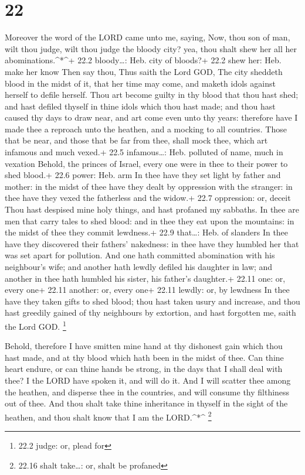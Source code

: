 \hypertarget{section-21}{%
\section{22}\label{section-21}}

 Moreover the word of the LORD came unto me, saying,
 Now, thou son of man, wilt thou judge, wilt thou judge the
bloody city? yea, thou shalt shew her all her abominations.\^{}*\^{}+
22.2 bloody\ldots: Heb. city of bloods?+ 22.2 shew her: Heb. make her
know  Then say thou, Thus saith the Lord GOD, The city
sheddeth blood in the midst of it, that her time may come, and maketh
idols against herself to defile herself.  Thou art become
guilty in thy blood that thou hast shed; and hast defiled thyself in
thine idols which thou hast made; and thou hast caused thy days to draw
near, and art come even unto thy years: therefore have I made thee a
reproach unto the heathen, and a mocking to all countries. 
Those that be near, and those that be far from thee, shall mock thee,
which art infamous and much vexed.+ 22.5 infamous\ldots: Heb. polluted
of name, much in vexation  Behold, the princes of Israel,
every one were in thee to their power to shed blood.+ 22.6 power: Heb.
arm  In thee have they set light by father and mother: in
the midst of thee have they dealt by oppression with the stranger: in
thee have they vexed the fatherless and the widow.+ 22.7 oppression: or,
deceit  Thou hast despised mine holy things, and hast
profaned my sabbaths.  In thee are men that carry tales to
shed blood: and in thee they eat upon the mountains: in the midst of
thee they commit lewdness.+ 22.9 that\ldots: Heb. of slanders
 In thee have they discovered their fathers' nakedness: in
thee have they humbled her that was set apart for pollution.
 And one hath committed abomination with his neighbour's
wife; and another hath lewdly defiled his daughter in law; and another
in thee hath humbled his sister, his father's daughter.+ 22.11 one: or,
every one+ 22.11 another: or, every one+ 22.11 lewdly: or, by lewdness
 In thee have they taken gifts to shed blood; thou hast
taken usury and increase, and thou hast greedily gained of thy
neighbours by extortion, and hast forgotten me, saith the Lord GOD.
\footnote{22.2 judge: or, plead for}

 Behold, therefore I have smitten mine hand at thy
dishonest gain which thou hast made, and at thy blood which hath been in
the midst of thee.  Can thine heart endure, or can thine
hands be strong, in the days that I shall deal with thee? I the LORD
have spoken it, and will do it.  And I will scatter thee
among the heathen, and disperse thee in the countries, and will consume
thy filthiness out of thee.  And thou shalt take thine
inheritance in thyself in the sight of the heathen, and thou shalt know
that I am the LORD.\^{}*\^{} \footnote{22.16 shalt take\ldots: or, shalt
  be profaned}

